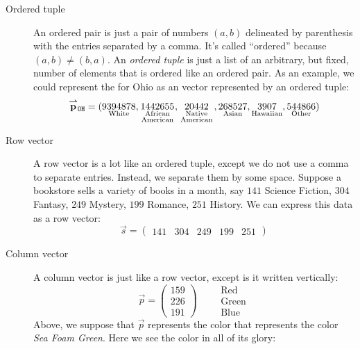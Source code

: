 \documentclass{ximera}
\begin{document}
\begin{concept}
\begin{description}
\item[Ordered tuple] An ordered pair is just a pair of numbers
  $(a,b)$ delineated by parenthesis with the entries separated by a
  comma. It's called ``ordered'' because $(a,b) \ne (b,a)$. An \textit{ordered
  tuple} is just a list of an arbitrary, but fixed, number of elements
  that is ordered like an ordered pair. As an example, we could
  represent the  for Ohio as an vector
  represented by an ordered tuple:
  \[
  \vec{p}_{\texttt{OH}} = (\underset{\text{White}}{9394878},\underset{\begin{smallmatrix}\text{\scriptsize African}\\ \text{\scriptsize American}\end{smallmatrix}}{1442655},\underset{\begin{smallmatrix}\text{\scriptsize Native}\\\text{\scriptsize American}\end{smallmatrix}}{20442},\underset{\text{Asian}}{268527},\underset{\text{Hawaiian}}{3907},\underset{\text{Other}}{544866})
  \]
\item[Row vector] A row vector is a lot like an ordered tuple, except
  we do not use a comma to separate entries. Instead, we separate them
  by some space.  Suppose a bookstore sells a variety of books in a
  month, say $141$ Science Fiction, $304$ Fantasy, $249$ Mystery,
  $199$ Romance, $251$ History.  We can express this
  data as a row vector:
  \[
  \vec{s} = \begin{pmatrix}141 & 304 & 249 & 199 & 251 \end{pmatrix}
  \]
  \item[Column vector] A column vector is just like a row vector,
  except is it written vertically:
  \[
  \vec{p} = \begin{pmatrix}
    159\\  226 \\ 191\end{pmatrix}
    \qquad
    \begin{array}{l}
    \text{Red}\\
    \text{Green}\\
    \text{Blue}
    \end{array}
  \]
  Above, we suppose that $\vec{p}$ represents the color that
  represents the color \textit{Sea Foam Green}. Here we see the color in all of its glory:

\end{description}
\end{concept}
\end{document}
